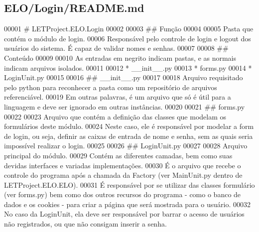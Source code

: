 \hypertarget{ELO_2Login_2README_8md_source}{}\subsection{E\+L\+O/\+Login/\+R\+E\+A\+D\+M\+E.md}

\begin{DoxyCode}
00001 # LETProject.ELO.Login
00002 
00003 ## Função
00004 
00005 Pasta que contém o módulo de login.
00006 Responsável pelo controle de login e logout dos usuários do sistema. É capaz de validar nomes e
       senhas.
00007 
00008 ## Conteúdo
00009 
00010 As entradas em negrito indicam pastas, e as normais indicam arquivos isolados.
00011 
00012 * \_\_init\_\_.py
00013 * forms.py
00014 * LoginUnit.py
00015 
00016 ## \_\_init\_\_.py
00017 
00018 Arquivo requisitado pelo python para reconhecer a pasta como um repositório de arquivos referenciável.
00019 Em outras palavras, é um arquivo que só é útil para a linguagem e deve ser ignorado em outras
       instâncias.
00020 
00021 ## forms.py
00022 
00023 Arquivo que contém a definição das classes que modelam os formulários deste módulo.
00024 Neste caso, ele é responsável por modelar a form de login, ou seja, definir as caixas de entrada de
       nome e senha, sem as quais seria impossível realizar o login.
00025 
00026 ## LoginUnit.py
00027 
00028 Arquivo principal do módulo.
00029 Contém as diferentes camadas, bem como suas devidas interfaces e variadas implementações.
00030 É o arquivo que recebe o controle do programa após a chamada da Factory (ver MainUnit.py dentro de
       LETProject.ELO.ELO). 
00031 É responsável por se utilizar das classes formulário (ver forms.py) bem como dos outros recursos do
       programa - como o banco de dados e os cookies - para criar a página que será mostrada para o usuário.
00032 No caso da LoginUnit, ela deve ser responsável por barrar o acesso de usuários não registrados, ou que
       não consigam inserir a senha.
\end{DoxyCode}
